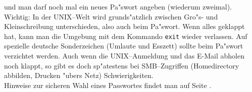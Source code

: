 und man darf noch mal ein neues Pa"swort angeben (wiederum zweimal). Wichtig:
In der \glossar UNIX--Welt wird grunds"atzlich zwischen Gro"s- und
Kleinschreibung unterschieden, also auch beim Pa"swort. Wenn alles geklappt
hat, kann man die Umgebung mit dem Kommando \verb#exit# wieder verlassen. Auf
spezielle deutsche Sonderzeichen (Umlaute und Esszett) sollte beim Pa"swort
verzichtet werden. Auch wenn die \glossar UNIX--Anmeldung und das \glossar
E-Mail abholen noch klappt, so gibt es doch sp"atestens bei \glossar
SMB--Zugriffen (\glossar Homedirectory abbilden, Drucken "ubers Netz)
Schwierigkeiten.\\
Hinweise zur sicheren Wahl eines Passwortes findet man auf Seite
\pageref{passwort}.

